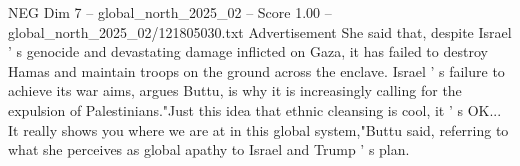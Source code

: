 \begin{textsample}{NEG Dim 7 – global\_north\_2025\_02 – Score 1.00 – global\_north\_2025\_02/121805030.txt}
Advertisement She said that, despite Israel ' s genocide and devastating damage inflicted on Gaza, it has failed to destroy Hamas and maintain troops on the ground across the enclave.
Israel ' s failure to achieve its war aims, argues Buttu, is why it is increasingly calling for the expulsion of Palestinians."Just this idea that ethnic cleansing is cool, it ' s OK...
It really shows you where we are at in this global system,"Buttu said, referring to what she perceives as global apathy to Israel and Trump ' s plan.

\end{textsample}

